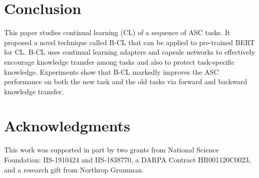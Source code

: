 \documentclass[11pt]{article}
\begin{document}
\section{Conclusion}
This paper studies continual learning (CL) of a sequence of ASC tasks. 
It proposed a novel technique called B-CL that can be applied to pre-trained BERT for CL. B-CL uses continual learning adapters and capsule networks to effectively encourage knowledge transfer among tasks and also to protect task-specific knowledge.
Experiments show that B-CL markedly improves the ASC performance on both the new task and the old tasks via forward and backward knowledge transfer.


\section*{Acknowledgments}
This work was supported in part by two grants from National Science Foundation: IIS-1910424 and IIS-1838770, a DARPA Contract HR001120C0023, and a research gift from Northrop Grumman.











\end{document}
